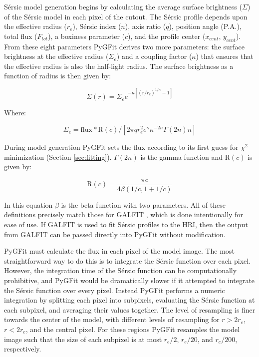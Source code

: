 \documentclass[apj]{emulateapj}
\newcommand{\sersic}{S\'{e}rsic}
\newcommand{\galfit}{GALFIT}
\newcommand{\pygfit}{PyGFit}
\begin{document}
\sersic{} model generation begins by calculating the average surface brightness ($\Sigma$) of the \sersic{} model in each pixel of the cutout.  The \sersic{} profile depends upon the effective radius ($r_e$), \sersic{} index ($n$), axis ratio ($q$), position angle (P.A.), total flux ($F_{tot}$), a boxiness parameter ($c$), and the profile center ($x_{cent}$, $y_{cent}$).  From these eight parameters \pygfit{} derives two more parameters: the surface brightness at the effective radius ($\Sigma_e$) and a coupling factor ($\kappa$) that ensures that the effective radius is also the half-light radius.  The surface brightness as a function of radius is then given by:

\begin{equation}\Sigma(r) = \Sigma_{e}e^{-\kappa[(r/r_e)^{1/n}-1]}\end{equation}

Where:

\begin{equation}\Sigma_e = \textrm{flux}*\textrm{R}(c) / [ 2{\pi}qr_e^2e^{\kappa}\kappa^{-2n}\Gamma(2n)n ]\end{equation}

During model generation \pygfit{} sets the flux according to its first guess for $\chi^2$ minimization (Section \ref{sec:fitting}).  $\Gamma(2n)$ is the gamma function and $\textrm{R}(c)$ is given by:

\begin{equation}\textrm{R}(c) = \frac{{\pi}c}{4\beta(1/c, 1+1/c)}\end{equation}

{\noindent}In this equation $\beta$ is the beta function with two parameters.  All of these definitions precisely match those for \galfit{} \citep{peng02,peng10}, which is done intentionally for ease of use.  If \galfit{} is used to fit \sersic{} profiles to the HRI, then the output from \galfit{} can be passed directly into \pygfit{} without modification.

\pygfit{} must calculate the flux in each pixel of the model image.  The most straightforward way to do this is to integrate the \sersic{} function over each pixel.  However, the integration time of the \sersic{} function can be computationally prohibitive, and \pygfit{} would be dramatically slower if it attempted to integrate the \sersic{} function over every pixel.  Instead \pygfit{} performs a numeric integration by splitting each pixel into subpixels, evaluating the \sersic{} function at each subpixel, and averaging their values together.  The level of resampling is finer towards the center of the model, with different levels of resampling for $r>2r_e$, $r<2r_e$, and the central pixel.  For these regions \pygfit{} resamples the model image such that the size of each subpixel is at most $r_e/2$, $r_e/20$, and $r_e/200$, respectively.
\end{document}
